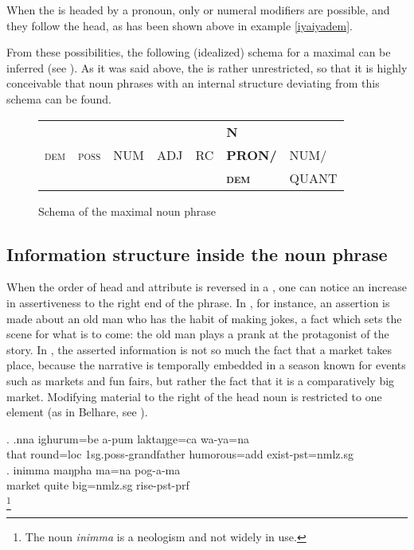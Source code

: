  When the  is headed by a pronoun, only  or numeral modifiers are possible, and they follow the head, as has been shown above in example \ref{iyaiyadem}.
 
 
From these possibilities, the following (idealized) schema for a maximal  can be inferred (see ). As it was said above, the  is rather unrestricted, so that it is highly conceivable that noun phrases with an internal structure deviating from this schema can be found.
 	 
\begin{figure} 
\begin{tabular}{lllllll} 
&&&&&\textbf{N}&\\ 
\textsc{dem}&\textsc{poss}&NUM&ADJ&RC&\textbf{PRON/}&NUM/\\
&&&&&\textbf{\textsc{dem}}&QUANT\\ 
\end{tabular} 
\caption{Schema of the maximal noun phrase}\label{np-max} 
\end{figure}
 

\subsection{Information structure inside the noun phrase}

When the order of head and attribute is reversed in a , one can notice an increase in assertiveness to the right end of the phrase. In \Next[a], for instance, an assertion is made about an old man who has the habit of making jokes, a fact which sets the scene for what is to come: the old man plays a prank at the protagonist of the story. In \Next[b], the asserted information is not so much the fact that a market takes place, because the narrative is temporally embedded in a season known for events such as markets and fun fairs, but rather the fact that it is a comparatively big market. Modifying material to the right of the head noun is restricted to one element (as in Belhare, see \citealt[562]{Bickel2003Belhare}).

\ex. \ag.nna  ighurum=be   a-pum                  laktaŋge=ca        wa-ya=na\\
that round{\sc =loc} {\sc 1sg.poss-}grandfather humorous{\sc =add} exist{\sc [3sg]-pst=nmlz.sg}\\
 
\bg. inimma maŋpha ma=na pog-a-ma\\
market quite big{\sc =nmlz.sg} rise{\sc [3sg]-pst-prf}\\
\footnote{The noun \emph{inimma} is a neologism and not widely in use.} 
  
